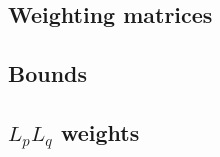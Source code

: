\subsection{Weighting matrices}
\label{sec:Weighting matrices:ElPoma}

%
%
\subsection{Bounds}
\label{sec:Bounds:ElPoma}


\subsection{$L_p L_q$ weights}
\label{sec:Lp Lq weights:ElPoma}


\endinput




Any text after an \endinput is ignored.
You could put scraps here or things in progress.
